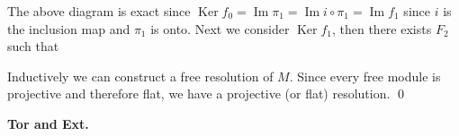 \documentclass[11pt]{amsart}
\DeclareMathOperator{\im}{\text{Im}}
\DeclareMathOperator{\Ker}{\text{Ker}}
\begin{document}
\begin{center}


\end{center}

The above diagram is exact since $\Ker f_0=\im \pi_1=\im i\circ \pi_1=\im f_1$ since $i$ is the inclusion map and $\pi_1$ is onto. Next we consider $\Ker f_1$, then there exists $F_2$ such that 

\begin{center}


\end{center}

Inductively we can construct a free resolution of $M$. Since every free module is projective and therefore flat, we have a projective (or flat) resolution. \qed

\textbf{Tor and Ext.}
\end{document}
